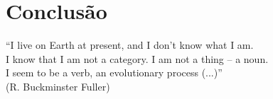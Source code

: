 \chapter{Conclusão}
\label{cap:coclusion}

\begin{flushright}
    ``I live on Earth at present, and I don’t know what I am. \\
    I know that I am not a category. I am not a thing -- a noun.\\ 
    I seem to be a verb, an evolutionary process (...)''\\[10px]
    (R. Buckminster Fuller)
    \end{flushright}